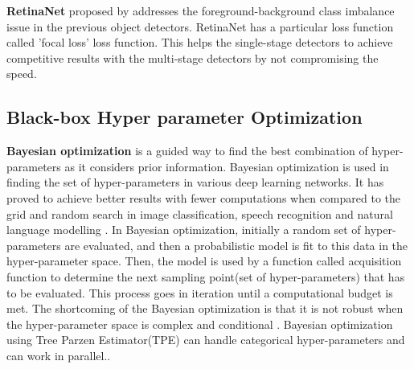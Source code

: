 \documentclass[thesis]{mas_proposal}
\begin{document}
\textbf{RetinaNet} proposed by \citet{lin2017focal} addresses the foreground-background class imbalance issue in the previous object detectors. RetinaNet has a particular loss function called 'focal loss' loss function. This helps the single-stage detectors to achieve competitive results with the multi-stage detectors by not compromising the speed.  

\subsection{Black-box Hyper parameter Optimization}



\textbf{Bayesian optimization}\cite{movckus1975bayesian} is a guided way to find the best combination of hyper-parameters as it considers prior information. Bayesian optimization is used in finding the set of hyper-parameters in various deep learning networks. It has proved to achieve better results with fewer computations when compared to the grid and random search in image classification, speech recognition and natural language modelling \cite{snoek2012practical}\cite{snoek2015scalable}\cite{melis2017state}\cite{dahl2013improving}. In Bayesian optimization, initially a random set of hyper-parameters are evaluated, and then a probabilistic model is fit to this data in the hyper-parameter space. Then, the model is used by a function called acquisition function to determine the next sampling point(set of hyper-parameters) that has to be evaluated. This process goes in iteration until a computational budget is met. The shortcoming of the Bayesian optimization is that it is not robust when the hyper-parameter space is complex and conditional \cite{wang2013bayesian} \cite{swersky2014raiders}.
Bayesian optimization using Tree Parzen Estimator(TPE) can handle categorical hyper-parameters and can work in parallel.\cite{bergstra2011algorithms}.\cite{feurer_hyperparameter_2018}  
\end{document}

